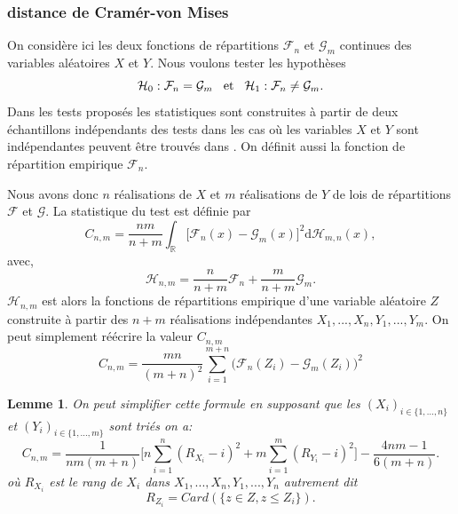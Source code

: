 \documentclass[a4paper,11pt]{article}
\newtheorem{lemma}{Lemme}
\begin{document}
\subsubsection{distance de Cramér-von Mises}
\label{ch:Cv-M}
On considère ici les deux fonctions de répartitions $\mathcal{F}_{n}$ et $\mathcal{G}_{m}$ continues des variables aléatoires $X$ et $Y$. Nous voulons tester les hypothèses
\begin{equation*}
	\mathcal{H}_0 : \mathcal{F}_{n} = \mathcal{G}_{m} \hspace{3mm}\textrm{et}\hspace{3mm} \mathcal{H}_1 : \mathcal{F}_{n} \neq \mathcal{G}_{m}.
\end{equation*}
Dans les tests proposés les statistiques sont construites à partir de deux échantillons indépendants des tests dans les cas où les variables $X$ et $Y$ sont indépendantes peuvent être trouvés dans \cite{ethier2011propos}. On définit aussi la fonction de répartition empirique $\mathcal{F}_n$.

Nous avons donc $n$ réalisations de $X$ et $m$ réalisations de $Y$ de lois de répartitions $\mathcal{F}$ et $\mathcal{G}$.
La statistique du test est définie par
\begin{equation}
	C_{n,m}=\frac{nm}{n+m}\int_{\mathbb{R}}\big[ \mathcal{F}_{n}(x)-\mathcal{G}_{m}(x)\big]^{2} \mathrm{d} \mathcal{H}_{m,n}(x),
\end{equation}
avec,
\begin{equation}
	\mathcal{H}_{n,m}=\frac{n}{n+m}\mathcal{F}_n+\frac{m}{n+m}\mathcal{G}_m.
\end{equation}
$\mathcal{H}_{n,m}$ est alors la fonctions de répartitions empirique d'une variable aléatoire $Z$ construite à partir des $n+m$ réalisations indépendantes $X_1,...,X_n,Y_1,...,Y_m$. On peut simplement réécrire la valeur $C_{n,m}$
\begin{equation}
	C_{n,m}=\frac{mn}{(m+n)^2}\sum_{i=1}^{m+n}\big(\mathcal{F}_n(Z_i)-\mathcal{G}_{m}(Z_i)\big)^2
\end{equation}

\begin{lemma}
	\label{C-v}
	On peut simplifier cette formule en supposant que les $(X_i)_{i\in \{1,...,n\}}$ et $(Y_i)_{i\in \{1,...,m\}}$ sont triés on a:
	\begin{equation}
		C_{n,m}=\frac{1}{nm(m+n)}\Big[ n\sum_{i=1}^{n}(R_{X_i}-i)^2+ m\sum_{i=1}^{m}(R_{Y_i}-i)^2\Big]-\frac{4nm-1}{6(m+n)}.
	\end{equation}
	où $R_{X_i}$ est le rang de $X_i$ dans $X_1,...,X_n,Y_1,...,Y_n$ autrement dit 
	\[R_{Z_i}=Card(\{z\in Z, z\leq Z_i\}).\] 
\end{lemma}
\end{document}
